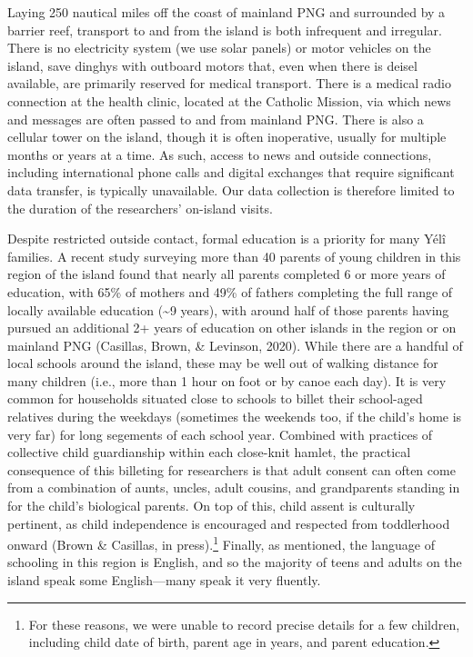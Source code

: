 \documentclass[english,,man,floatsintext]{apa6}
\begin{document}
Laying 250 nautical miles off the coast of mainland PNG and surrounded
by a barrier reef, transport to and from the island is both infrequent
and irregular. There is no electricity system (we use solar panels) or
motor vehicles on the island, save dinghys with outboard motors that,
even when there is deisel available, are primarily reserved for medical
transport. There is a medical radio connection at the health clinic,
located at the Catholic Mission, via which news and messages are often
passed to and from mainland PNG. There is also a cellular tower on the
island, though it is often inoperative, usually for multiple months or
years at a time. As such, access to news and outside connections,
including international phone calls and digital exchanges that require
significant data transfer, is typically unavailable. Our data collection
is therefore limited to the duration of the researchers' on-island
visits.

Despite restricted outside contact, formal education is a priority for
many Yélî families. A recent study surveying more than 40 parents of
young children in this region of the island found that nearly all
parents completed 6 or more years of education, with 65\% of mothers and
49\% of fathers completing the full range of locally available education
(\textasciitilde{}9 years), with around half of those parents having
pursued an additional 2+ years of education on other islands in the
region or on mainland PNG (Casillas, Brown, \& Levinson, 2020). While
there are a handful of local schools around the island, these may be
well out of walking distance for many children (i.e., more than 1 hour
on foot or by canoe each day). It is very common for households situated
close to schools to billet their school-aged relatives during the
weekdays (sometimes the weekends too, if the child's home is very far)
for long segements of each school year. Combined with practices of
collective child guardianship within each close-knit hamlet, the
practical consequence of this billeting for researchers is that adult
consent can often come from a combination of aunts, uncles, adult
cousins, and grandparents standing in for the child's biological
parents. On top of this, child assent is culturally pertinent, as child
independence is encouraged and respected from toddlerhood onward (Brown
\& Casillas, in press).\footnote{For these reasons, we were unable to
  record precise details for a few children, including child date of
  birth, parent age in years, and parent education.} Finally, as
mentioned, the language of schooling in this region is English, and so
the majority of teens and adults on the island speak some English---many
speak it very fluently.
\end{document}
